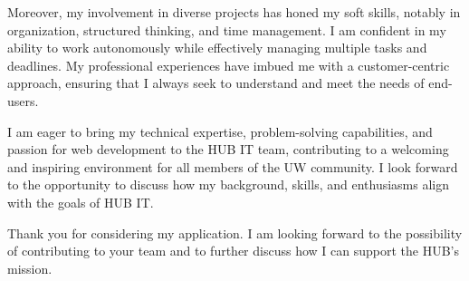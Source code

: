 \documentclass[11pt,letterpaper,roman]{moderncv}
\begin{document}
Moreover, my involvement in diverse projects has honed my soft skills, notably in organization, structured thinking, and time management. I am confident in my ability to work autonomously while effectively managing multiple tasks and deadlines. My professional experiences have imbued me with a customer-centric approach, ensuring that I always seek to understand and meet the needs of end-users.

I am eager to bring my technical expertise, problem-solving capabilities, and passion for web development to the HUB IT team, contributing to a welcoming and inspiring environment for all members of the UW community. I look forward to the opportunity to discuss how my background, skills, and enthusiasms align with the goals of HUB IT.

Thank you for considering my application. I am looking forward to the possibility of contributing to your team and to further discuss how I can support the HUB's mission.

\makeletterclosing
\end{document}
